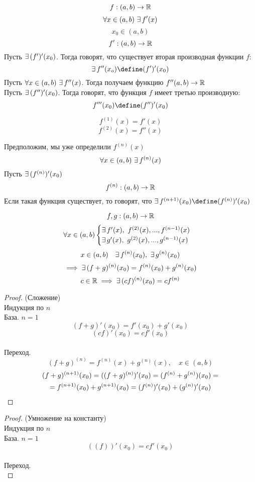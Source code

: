 \begin{definition}
	$$ f : (a,b) \to \mathbb{R} $$
    $$ \forall x \in (a,b) ~ \exists\, f'(x) $$
    $$ x_0 \in (a,b) $$
    $$ f' : (a,b) \to \mathbb{R} $$
    Пусть $ \exists\, (f')'(x_0) $. Тогда говорят, что существует вторая производная функции $f$:
    $$ \exist f''(x_o) \define (f')'(x_0) $$
    Пусть $ \forall x \in (a,b) ~ \exists\, f''(x) $. Тогда получаем функцию $ f''(a,b) \to \mathbb{R} $ \\
    Пусть $ \exists\, (f'')'(x_0) $. Тогда говорят, что функция $f$ имеет третью производную:
    $$ f'''(x_0) \define (f'')'(x_0) $$
\end{definition}

\begin{notation}
    $$ f^{(1)}(x) = f'(x) $$
    $$ f^{(2)}(x) = f''(x) $$
\end{notation}

Предположим, мы уже определили $ f^{(n)}(x) $ \\
$$ \forall x \in (a,b) ~ \exists\, f^{(n)}(x) $$
Пусть $ \exists\, (f^{(n)})'(x_0) $
$$ f^{(n)} : (a,b) \to \mathbb{R} $$
Если такая функция существует, то говорят, что $ \exist f^{(n+1)}(x_0) \define (f^{(n)})'(x_0) $

\begin{theorem}
	$$ f,g : (a,b) \to \mathbb{R} $$
    $$ \forall x \in (a,b) \begin{cases} \exists\, f'(x), ~ f^{(2)}(x), ..., f^{(n-1)}(x) \\ \exists\, g'(x), ~ g^{(2)}(x), ..., g^{(n-1)}(x) \end{cases} $$
    $$ x \in (a,b) \quad \exists\, f^{(n)}(x_0), ~ \exists\, g^{(n)}(x_0) $$
    $$ \implies \exists\, (f + g)^{(n)}(x_0) = f^{(n)}(x_0) + g^{(n)}(x_0) $$
    $$ c \in \mathbb{R} \implies \exists\, (cf)^{(n)}(x_0) = cf^{(n)} $$
\end{theorem}

\begin{proof}
    (Сложение) \\
	Индукция по $n$ \\
    База. $n = 1$
    $$ (f + g)'(x_0) = f'(x_0) + g'(x_0) $$
    $$ (cf)'(x_0) = cf'(x_0) $$ \ \\
    Переход.
    $$ (f + g)^{(n)} = f^{(n)}(x) + g^{(n)}(x), \quad x \in (a,b) $$
    \begin{multline}\lbl{21}
        (f + g)^{(n+1)}(x_0) = ((f + g)^{(n)})'(x_0) = (f^{(n)} + g^{(n)})(x_0) = \\ = f^{(n+1)}(x_0) + g^{(n+1)}(x_0) = (f^{(n)})'(x_0) + (g^{(n)})'(x_0)
    \end{multline}
\end{proof}

\begin{proof}
    (Умножение на константу) \\
	Индукция по $n$ \\
    База. $n = 1$
    $$ ((f))'(x_0) = cf'(x_0) $$ \ \\
    Переход.
    $$  $$
\end{proof}
